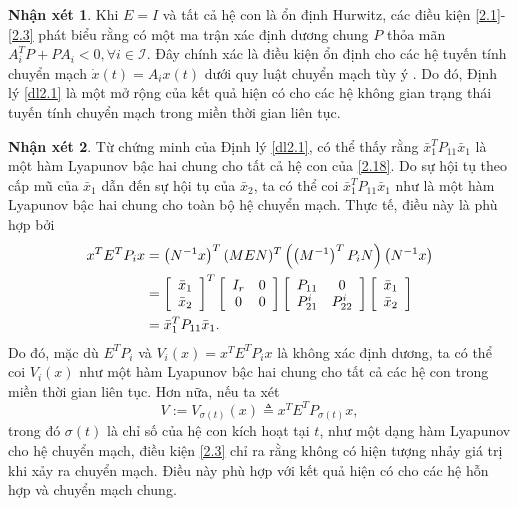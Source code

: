 \documentclass[12pt,a4paper]{report}
\theoremstyle{definition}
\newtheorem{nx}{Nhận xét}
\theoremstyle{definition}
\numberwithin{dl}{chapter}
\numberwithin{vd}{chapter}
\numberwithin{corollary}{chapter}
\numberwithin{lemma}{chapter}
\numberwithin{md}{chapter}
\numberwithin{dn}{chapter}
\numberwithin{cy}{chapter}
\numberwithin{nx}{chapter}
\begin{document}
\begin{nx}\label{Nx2} Khi $E=I$ và tất cả hệ con là ổn định Hurwitz, các điều kiện \eqref{2.1}-\eqref{2.3} phát biểu rằng có một ma trận xác định dương chung  $P$ thỏa mãn $A_{i}^{T} P+P A_{i}<0, \forall i \in \mathcal{I}$. Đây chính xác là điều kiện ổn định cho các hệ tuyến tính chuyển mạch  $\dot{x}(t)=A_{i} x(t)$ dưới quy luật  chuyển mạch tùy ý \cite{Nar94}. Do đó, Định lý \ref{dl2.1} là một mở rộng của kết quả hiện có cho các hệ không gian trạng thái tuyến tính chuyển mạch trong miền thời gian liên tục.\\
\end{nx} 

\begin{nx}\label{Nx3}  Từ chứng minh của Định lý \ref{dl2.1}, có thể thấy rằng $\bar{x}_{1}^{T} P_{11} \bar{x}_{1}$ là một hàm Lyapunov bậc hai chung cho tất cả hệ con của \eqref{2.18}. Do sự hội tụ theo cấp mũ của  $\bar{x}_{1}$ dẫn đến sự hội tụ của $\bar{x}_{2}$, ta có thể coi $\bar{x}_{1}^{T} P_{11} \bar{x}_{1}$ như là một hàm Lyapunov bậc hai chung cho toàn bộ hệ chuyển mạch. Thực tế, điều này là phù hợp bởi
%
\begin{align}\label{2.20}
x^{T} E^{T} P_{i} x &=\left(N^{-1} x\right)^{T}(M E N)^{T}\left(\left(M^{-1}\right)^{T} P_{i} N\right)\left(N^{-1} x\right)  \notag \\
&=\left[\begin{array}{c}
\bar{x}_{1} \\
\bar{x}_{2}
\end{array}\right]^{T}\left[\begin{array}{cc}
I_{r} & 0 \\
0 & 0
\end{array}\right]\left[\begin{array}{cc}
P_{11} & 0 \\
P_{21}^{i} & P_{22}^{i}
\end{array}\right]\left[\begin{array}{l}
\bar{x}_{1} \\
\bar{x}_{2}
\end{array}\right] \notag  \\
&=\bar{x}_{1}^{T} P_{11} \bar{x}_{1} .
\end{align} 
%
Do đó, mặc dù $E^{T} P_{i}$ và $V_{i}(x)=x^{T} E^{T} P_{i} x$ là không xác định dương, ta có thể coi $V_{i}(x)$ như một hàm Lyapunov bậc hai chung cho tất cả các  hệ con trong miền thời gian liên tục. Hơn nữa, nếu ta xét 
\begin{equation}\label{2.21}
V:=V_{\sigma(t)}(x) \triangleq x^{T} E^{T} P_{\sigma(t)} x,
\end{equation}
trong đó $\sigma(t)$ là chỉ số của hệ con kích hoạt tại $t$, như một dạng hàm Lyapunov cho hệ chuyển mạch, điều kiện \eqref{2.3} chỉ ra rằng không có hiện tượng nhảy giá trị khi xảy ra chuyển mạch. Điều này phù hợp với kết quả hiện có \cite{Br98} cho các hệ hỗn hợp và chuyển mạch chung.\\
\end{nx} 
\end{document}
